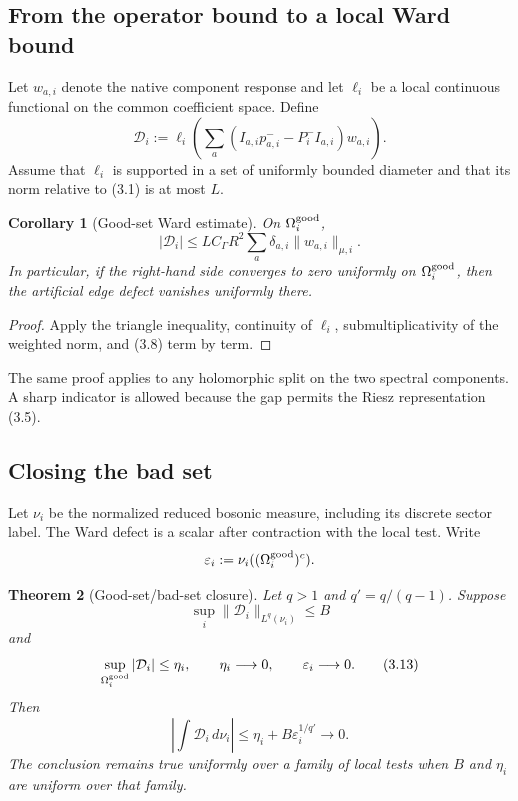 \documentclass[11pt]{article}
\newtheorem{theorem}{Theorem}[section]
\newtheorem{corollary}[theorem]{Corollary}
\begin{document}
\subsection{From the operator bound to a local Ward bound}

Let \(w_{a,i}\) denote the native component response and let
\(\ell_i\) be a local continuous functional on the common coefficient
space.  Define
\[
 \mathcal D_i
 :=
 \ell_i\left(
 \sum_a
 (I_{a,i}p_{a,i}^- -P_i^-I_{a,i})w_{a,i}
 \right).
 \tag{3.10}
\]
Assume that \(\ell_i\) is supported in a set of uniformly bounded diameter
and that its norm relative to (3.1) is at most \(L\).

\begin{corollary}[Good-set Ward estimate]
\label{cor:v11v3-good-set}
On \(\Omega_i^{\rm good}\),
\[
 |\mathcal D_i|
 \leq
 LC_\Gamma R^2
 \sum_a\delta_{a,i}\|w_{a,i}\|_{\mu,i}.
 \tag{3.11}
\]
In particular, if the right-hand side converges to zero uniformly on
\(\Omega_i^{\rm good}\), then the artificial edge defect vanishes
uniformly there.
\end{corollary}

\begin{proof}
Apply the triangle inequality, continuity of \(\ell_i\), submultiplicativity
of the weighted norm, and (3.8) term by term.
\end{proof}

The same proof applies to any holomorphic split on the two spectral
components.  A sharp indicator is allowed because the gap permits the
Riesz representation (3.5).

\subsection{Closing the bad set}

Let \(\nu_i\) be the normalized reduced bosonic measure, including its
discrete sector label.  The Ward defect is a scalar after contraction with
the local test.  Write
\[
 \varepsilon_i:=\nu_i((\Omega_i^{\rm good})^c).
\]

\begin{theorem}[Good-set/bad-set closure]
\label{thm:v11v3-good-bad}
Let \(q>1\) and \(q'=q/(q-1)\).  Suppose
\[
 \sup_i\|\mathcal D_i\|_{L^q(\nu_i)}\leq B
 \tag{3.12}
\]
and
\[
 \sup_{\Omega_i^{\rm good}}|\mathcal D_i|\leq\eta_i,
 \qquad
 \eta_i\longrightarrow0,
 \qquad
 \varepsilon_i\longrightarrow0.
 \tag{3.13}
\]
Then
\[
 \left|\int\mathcal D_i\,d\nu_i\right|
 \leq
 \eta_i+B\varepsilon_i^{1/q'}
 \longrightarrow0.
 \tag{3.14}
\]
The conclusion remains true uniformly over a family of local tests when
\(B\) and \(\eta_i\) are uniform over that family.
\end{theorem}
\end{document}
